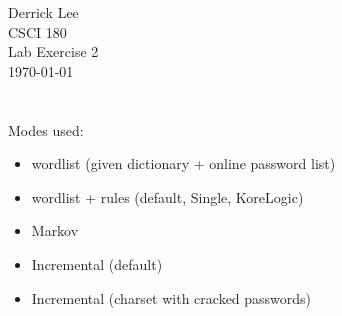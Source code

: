 \documentclass[12pt]{exam}
\begin{document}
\noindent
Derrick Lee\\
CSCI 180\\
Lab Exercise 2\\
\today\\

\section{}

Modes used:
\begin{itemize}[noitemsep]
    \item wordlist (given dictionary + online password list)
    \item wordlist + rules (default, Single, KoreLogic)
    \item Markov
    \item Incremental (default)
    \item Incremental (charset with cracked passwords)
\end{itemize}
\end{document}
